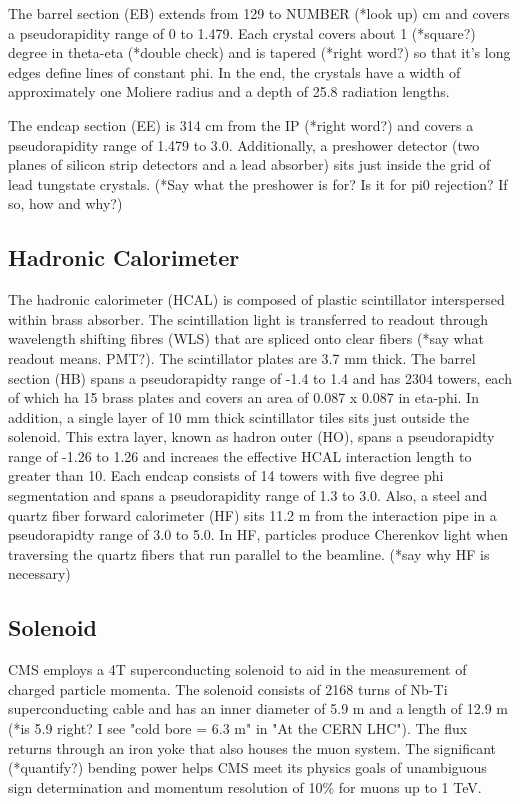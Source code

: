 \documentclass[12pt]{article}
\begin{document}
        The barrel section (EB) extends from 129 to NUMBER (*look up) cm and covers a pseudorapidity range of 0 to 1.479. Each crystal covers about 1 (*square?) degree in theta-eta (*double check) and is tapered (*right word?) so that it's long edges define lines of constant phi. In the end, the crystals have a width of approximately one Moliere radius and a depth of 25.8 radiation lengths.

        The endcap section (EE) is 314 cm from the IP (*right word?) and covers a pseudorapidity range of 1.479 to 3.0. Additionally, a preshower detector (two planes of silicon strip detectors and a lead absorber) sits just inside the grid of lead tungstate crystals. (*Say what the preshower is for? Is it for pi0 rejection? If so, how and why?)

\subsection{Hadronic Calorimeter}
        The hadronic calorimeter (HCAL) is composed of plastic scintillator interspersed within brass absorber. The scintillation light is transferred to readout through wavelength shifting fibres (WLS) that are spliced onto clear fibers (*say what readout means. PMT?). The scintillator plates are 3.7 mm thick.
        The barrel section (HB) spans a pseudorapidty range of -1.4 to 1.4 and has 2304 towers, each of which ha 15 brass plates and covers an area of 0.087 x 0.087 in eta-phi. In addition, a single layer of 10 mm thick scintillator tiles sits just outside the solenoid. This extra layer, known as hadron outer (HO), spans a pseudorapidty range of -1.26 to 1.26 and increaes the effective HCAL interaction length to greater than 10.
        Each endcap consists of 14 towers with five degree phi segmentation and spans a pseudorapidity range of 1.3 to 3.0. Also, a steel and quartz fiber forward calorimeter (HF) sits 11.2 m from the interaction pipe in a pseudorapidty range of 3.0 to 5.0. In HF, particles produce Cherenkov light when traversing the quartz fibers that run parallel to the beamline. (*say why HF is necessary)

\subsection{Solenoid}
        CMS employs a 4T superconducting solenoid to aid in the measurement of charged particle momenta. The solenoid consists of 2168 turns of Nb-Ti superconducting cable and has an inner diameter of 5.9 m and a length of 12.9 m (*is 5.9 right? I see "cold bore = 6.3 m" in "At the CERN LHC"). The flux returns through an iron yoke that also houses the muon system. The significant (*quantify?) bending power helps CMS meet its physics goals of unambiguous sign determination and momentum resolution of 10\% for muons up to 1 TeV.
\end{document}
